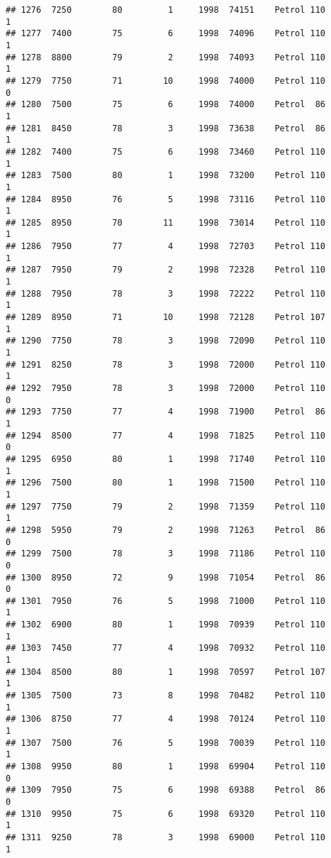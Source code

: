 \documentclass[]{article}
\begin{document}
\begin{verbatim}
## 1276  7250        80         1     1998  74151    Petrol 110         1
## 1277  7400        75         6     1998  74096    Petrol 110         1
## 1278  8800        79         2     1998  74093    Petrol 110         1
## 1279  7750        71        10     1998  74000    Petrol 110         0
## 1280  7500        75         6     1998  74000    Petrol  86         1
## 1281  8450        78         3     1998  73638    Petrol  86         1
## 1282  7400        75         6     1998  73460    Petrol 110         1
## 1283  7500        80         1     1998  73200    Petrol 110         1
## 1284  8950        76         5     1998  73116    Petrol 110         1
## 1285  8950        70        11     1998  73014    Petrol 110         1
## 1286  7950        77         4     1998  72703    Petrol 110         1
## 1287  7950        79         2     1998  72328    Petrol 110         1
## 1288  7950        78         3     1998  72222    Petrol 110         1
## 1289  8950        71        10     1998  72128    Petrol 107         1
## 1290  7750        78         3     1998  72090    Petrol 110         1
## 1291  8250        78         3     1998  72000    Petrol 110         1
## 1292  7950        78         3     1998  72000    Petrol 110         0
## 1293  7750        77         4     1998  71900    Petrol  86         1
## 1294  8500        77         4     1998  71825    Petrol 110         0
## 1295  6950        80         1     1998  71740    Petrol 110         1
## 1296  7500        80         1     1998  71500    Petrol 110         1
## 1297  7750        79         2     1998  71359    Petrol 110         1
## 1298  5950        79         2     1998  71263    Petrol  86         0
## 1299  7500        78         3     1998  71186    Petrol 110         0
## 1300  8950        72         9     1998  71054    Petrol  86         0
## 1301  7950        76         5     1998  71000    Petrol 110         1
## 1302  6900        80         1     1998  70939    Petrol 110         1
## 1303  7450        77         4     1998  70932    Petrol 110         1
## 1304  8500        80         1     1998  70597    Petrol 107         1
## 1305  7500        73         8     1998  70482    Petrol 110         1
## 1306  8750        77         4     1998  70124    Petrol 110         1
## 1307  7500        76         5     1998  70039    Petrol 110         1
## 1308  9950        80         1     1998  69904    Petrol 110         0
## 1309  7950        75         6     1998  69388    Petrol  86         0
## 1310  9950        75         6     1998  69320    Petrol 110         1
## 1311  9250        78         3     1998  69000    Petrol 110         1

\end{verbatim}
\end{document}
